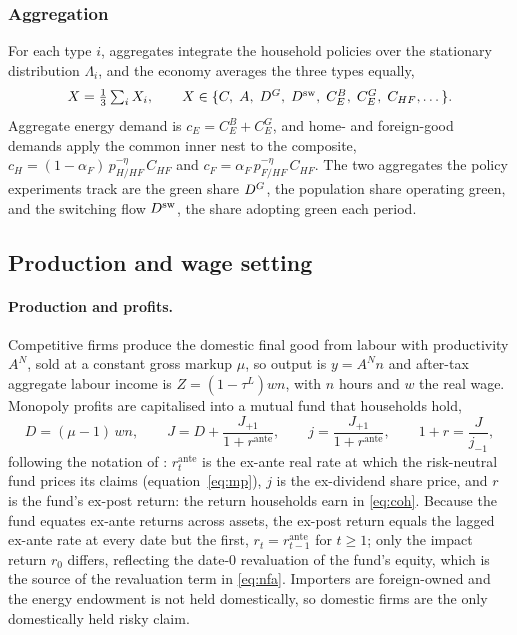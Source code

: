 \subsubsection{Aggregation}\label{sec:agg2}

For each type $i$, aggregates integrate the household policies over the stationary
distribution $\Lambda_i$, and the economy averages the three types equally,
%
\begin{equation}
X=\tfrac13\textstyle\sum_i X_i,
\qquad
X\in\{C,\;A,\;D^{G},\;D^{\mathrm{sw}},\;C^B_E,\;C^G_E,\;C_{HF},\dots\}.
\label{eq:agg}
\end{equation}
%
Aggregate energy demand is $c_E=C^B_E+C^G_E$, and home- and foreign-good demands apply
the common inner nest to the composite,
$c_H=(1-\alpha_F)\,p_{H/HF}^{-\eta}\,C_{HF}$ and
$c_F=\alpha_F\,p_{F/HF}^{-\eta}\,C_{HF}$. The two aggregates the policy experiments
track are the green share $D^{G}$, the population share operating green, and the
switching flow $D^{\mathrm{sw}}$, the share adopting green each period.

\subsection{Production and wage setting}\label{sec:firms}

\paragraph{Production and profits.}
Competitive firms produce the domestic final good from labour with productivity
$A^N$, sold at a constant gross markup $\mu$, so output is $y=A^N n$ and after-tax
aggregate labour income is $Z=(1-\tau^L)wn$, with $n$ hours and $w$ the real wage. Monopoly profits are capitalised into a mutual fund that households
hold,
%
\begin{equation}
D=(\mu-1)\,wn,
\qquad
J=D+\frac{J_{+1}}{1+r^{\mathrm{ante}}},
\qquad
j=\frac{J_{+1}}{1+r^{\mathrm{ante}}},
\qquad
1+r=\frac{J}{j_{-1}},
\label{eq:fund}
\end{equation}
%
following the notation of \citet{ARS2024}: $r^{\mathrm{ante}}_t$ is the ex-ante real
rate at which the risk-neutral fund prices its claims (equation~\eqref{eq:mp}), $j$ is
the ex-dividend share price, and $r$ is the fund's ex-post return: the return
households earn in \eqref{eq:coh}. Because the fund equates ex-ante returns across
assets, the ex-post return equals the lagged ex-ante rate at every date but the
first, $r_t=r^{\mathrm{ante}}_{t-1}$ for $t\ge1$; only the impact return $r_0$ differs,
reflecting the date-0 revaluation of the fund's equity, which is the source of the
revaluation term in \eqref{eq:nfa}. Importers are foreign-owned and the energy
endowment is not held domestically, so domestic firms are the only domestically held
risky claim.

